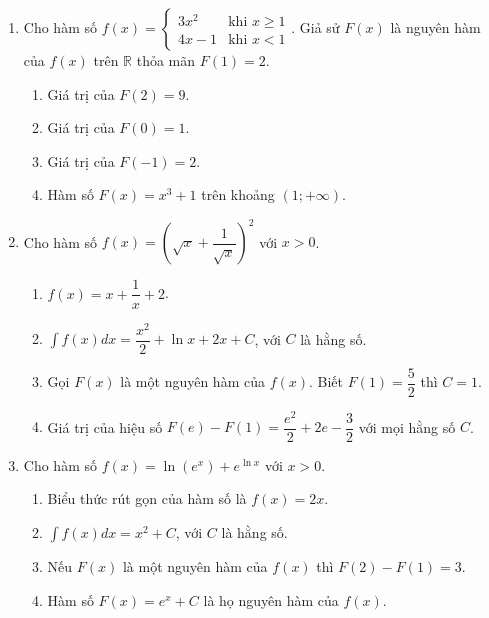\documentclass[12pt]{article}
\begin{document}
\begin{enumerate}[label=\textbf{Câu \arabic*.}, start=1]
		\item Cho hàm số $f(x) = \begin{cases} 3x^2 & \text{khi } x \ge 1 \\ 4x - 1 & \text{khi } x < 1 \end{cases}$. Giả sử $F(x)$ là nguyên hàm của $f(x)$ trên $\mathbb{R}$ thỏa mãn $F(1) = 2$.
		\begin{enumerate}[label=\alph*)]
			\item Giá trị của $F(2) = 9$.
			\item Giá trị của $F(0) = 1$.
			\item Giá trị của $F(-1) = 2$.
			\item Hàm số $F(x) = x^3 + 1$ trên khoảng $(1; +\infty)$.
		\end{enumerate}
		
		\item Cho hàm số $f(x) = \left( \sqrt{x} + \dfrac{1}{\sqrt{x}} \right)^2$ với $x > 0$.
		\begin{enumerate}[label=\alph*)]
			\item $f(x) = x + \dfrac{1}{x} + 2$.
			\item $\displaystyle \int f(x) dx = \dfrac{x^2}{2} + \ln x + 2x + C$, với $C$ là hằng số.
			\item Gọi $F(x)$ là một nguyên hàm của $f(x)$. Biết $F(1) = \dfrac{5}{2}$ thì $C = 1$.
			\item Giá trị của hiệu số $F(e) - F(1) = \dfrac{e^2}{2} + 2e - \dfrac{3}{2}$ với mọi hằng số $C$.
		\end{enumerate}
		
		\item Cho hàm số $f(x) = \ln(e^x) + e^{\ln x}$ với $x > 0$.
		\begin{enumerate}[label=\alph*)]
			\item Biểu thức rút gọn của hàm số là $f(x) = 2x$.
			\item $\displaystyle \int f(x) dx = x^2 + C$, với $C$ là hằng số.
			\item Nếu $F(x)$ là một nguyên hàm của $f(x)$ thì $F(2) - F(1) = 3$.
			\item Hàm số $F(x) = e^x + C$ là họ nguyên hàm của $f(x)$.
		\end{enumerate}
		

\end{enumerate}
\end{document}
